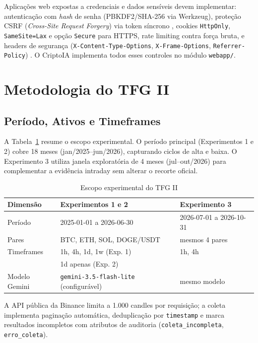 \documentclass[conference]{IEEEtran}
\begin{document}
Aplicações web expostas a credenciais e dados sensíveis devem implementar: autenticação com \textit{hash} de senha (PBKDF2/SHA-256 via Werkzeug), proteção CSRF (\textit{Cross-Site Request Forgery}) via token síncrono \cite{owasp2021csrf}, cookies \texttt{HttpOnly}, \texttt{SameSite=Lax} e opção \texttt{Secure} para HTTPS, rate limiting contra força bruta, e headers de segurança (\texttt{X-Content-Type-Options}, \texttt{X-Frame-Options}, \texttt{Referrer-Policy}) \cite{owasp2021headers}. O CriptoIA implementa todos esses controles no módulo \texttt{webapp/}.

\section{Metodologia do TFG II}
\label{sec:metodologia}

\subsection{Período, Ativos e Timeframes}

A Tabela~\ref{tab:periodo} resume o escopo experimental. O período principal (Experimentos 1 e 2) cobre 18 meses (jan/2025–jun/2026), capturando ciclos de alta e baixa. O Experimento 3 utiliza janela exploratória de 4 meses (jul–out/2026) para complementar a evidência intraday sem alterar o recorte oficial.

\begin{table}[H]
  \centering
  \caption{Escopo experimental do TFG II}
  \label{tab:periodo}
  \small
  \begin{tabular}{lll}
    \toprule
    \textbf{Dimensão} & \textbf{Experimentos 1 e 2} & \textbf{Experimento 3} \\
    \midrule
    Período         & 2025-01-01 a 2026-06-30   & 2026-07-01 a 2026-10-31 \\
    Pares           & BTC, ETH, SOL, DOGE/USDT  & mesmos 4 pares          \\
    Timeframes      & 1h, 4h, 1d, 1w (Exp. 1)   & 1h, 4h                  \\
                    & 1d apenas (Exp. 2)        &                         \\
    Modelo Gemini   & \texttt{gemini-3.5-flash-lite} (configurável) & mesmo modelo \\
    \bottomrule
  \end{tabular}
\end{table}

A API pública da Binance limita a 1.000 candles por requisição; a coleta implementa paginação automática, deduplicação por \texttt{timestamp} e marca resultados incompletos com atributos de auditoria (\texttt{coleta\_incompleta}, \texttt{erro\_coleta}).
\end{document}
